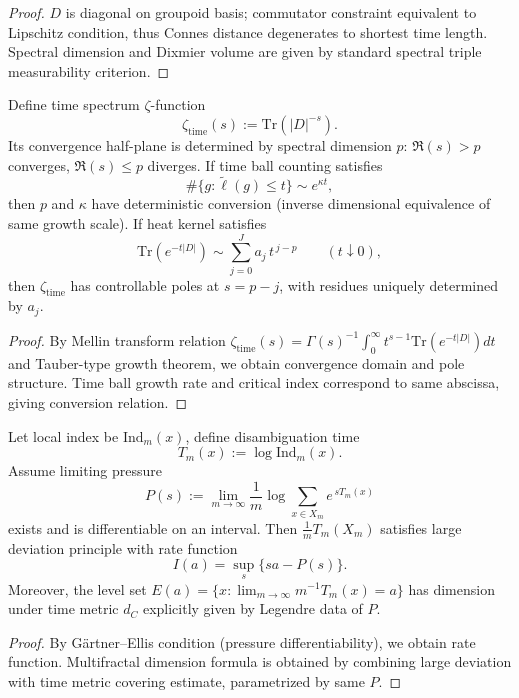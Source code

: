 \begin{proof}
\(D\) is diagonal on groupoid basis; commutator constraint equivalent to Lipschitz condition, thus Connes distance degenerates to shortest time length.
Spectral dimension and Dixmier volume are given by standard spectral triple measurability criterion.
\end{proof}

\begin{theorem}\label{thm:xi-time-zeta-singularity-from-growth}
Define time spectrum \(\zeta\)-function
\[
\zeta_{\mathrm{time}}(s):=\mathrm{Tr}(|D|^{-s}).
\]
Its convergence half-plane is determined by spectral dimension \(p\): \(\Re(s)>p\) converges, \(\Re(s)\le p\) diverges.
If time ball counting satisfies
\[
\#\{g:\widetilde\ell(g)\le t\}\sim e^{\kappa t},
\]
then \(p\) and \(\kappa\) have deterministic conversion (inverse dimensional equivalence of same growth scale).
If heat kernel satisfies
\[
\mathrm{Tr}(e^{-t|D|})
\sim
\sum_{j=0}^{J}a_j\,t^{\,j-p}
\qquad(t\downarrow 0),
\]
then \(\zeta_{\mathrm{time}}\) has controllable poles at \(s=p-j\), with residues uniquely determined by \(a_j\).
\end{theorem}

\begin{proof}
By Mellin transform relation
\(
\zeta_{\mathrm{time}}(s)=\Gamma(s)^{-1}\int_0^\infty t^{s-1}\mathrm{Tr}(e^{-t|D|})dt
\)
and Tauber-type growth theorem, we obtain convergence domain and pole structure.
Time ball growth rate and critical index correspond to same abscissa, giving conversion relation.
\end{proof}

\begin{theorem}\label{thm:xi-fiber-time-multifractal-legendre}
Let local index be \(\mathrm{Ind}_m(x)\), define disambiguation time
\[
T_m(x):=\log \mathrm{Ind}_m(x).
\]
Assume limiting pressure
\[
P(s):=\lim_{m\to\infty}\frac1m\log\sum_{x\in X_m}e^{\,sT_m(x)}
\]
exists and is differentiable on an interval.
Then \(\frac1mT_m(X_m)\) satisfies large deviation principle with rate function
\[
I(a)=\sup_s\{sa-P(s)\}.
\]
Moreover, the level set
\(
E(a)=\{x:\lim_{m\to\infty}m^{-1}T_m(x)=a\}
\)
has dimension under time metric \(d_C\) explicitly given by Legendre data of \(P\).
\end{theorem}

\begin{proof}
By Gärtner--Ellis condition (pressure differentiability), we obtain rate function.
Multifractal dimension formula is obtained by combining large deviation with time metric covering estimate, parametrized by same \(P\).
\end{proof}

